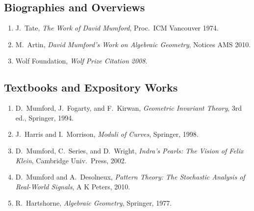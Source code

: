 \subsection*{Biographies and Overviews}
\begin{enumerate}
    \item J.\ Tate, \textit{The Work of David Mumford}, Proc.\ ICM Vancouver 1974.
    \item M.\ Artin, \textit{David Mumford's Work on Algebraic Geometry}, Notices AMS 2010.
    \item Wolf Foundation, \textit{Wolf Prize Citation 2008}.
\end{enumerate}

\subsection*{Textbooks and Expository Works}
\begin{enumerate}
    \item D.\ Mumford, J.\ Fogarty, and F.\ Kirwan, \textit{Geometric Invariant Theory}, 3rd ed., Springer, 1994.
    \item J.\ Harris and I.\ Morrison, \textit{Moduli of Curves}, Springer, 1998.
    \item D.\ Mumford, C.\ Series, and D.\ Wright, \textit{Indra's Pearls: The Vision of Felix Klein}, Cambridge Univ.\ Press, 2002.
    \item D.\ Mumford and A.\ Desolneux, \textit{Pattern Theory: The Stochastic Analysis of Real-World Signals}, A K Peters, 2010.
    \item R.\ Hartshorne, \textit{Algebraic Geometry}, Springer, 1977.
\end{enumerate}

